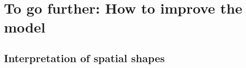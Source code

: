 \chapter{To go further: How to improve the model}
\label{ch:discussion}


%	

\section{Interpretation of spatial shapes}
%		



